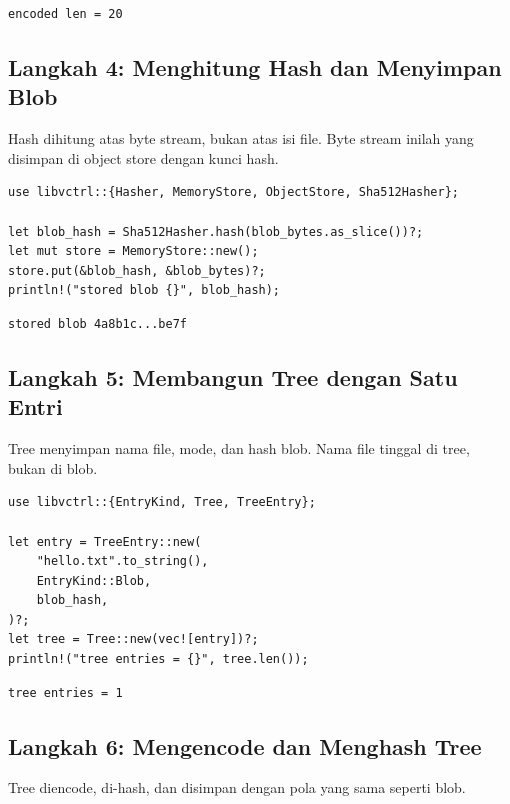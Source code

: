 \documentclass[11pt,a4paper]{article}
\begin{document}
\begin{lstlisting}[style=out]
encoded len = 20
\end{lstlisting}

\subsection{Langkah 4: Menghitung Hash dan Menyimpan Blob}

Hash dihitung atas byte stream, bukan atas isi file. Byte stream inilah yang disimpan di object store dengan kunci hash.

\begin{lstlisting}[style=code]
use libvctrl::{Hasher, MemoryStore, ObjectStore, Sha512Hasher};

let blob_hash = Sha512Hasher.hash(blob_bytes.as_slice())?;
let mut store = MemoryStore::new();
store.put(&blob_hash, &blob_bytes)?;
println!("stored blob {}", blob_hash);
\end{lstlisting}

\begin{lstlisting}[style=out]
stored blob 4a8b1c...be7f
\end{lstlisting}

\subsection{Langkah 5: Membangun Tree dengan Satu Entri}

Tree menyimpan nama file, mode, dan hash blob. Nama file tinggal di tree, bukan di blob.

\begin{lstlisting}[style=code]
use libvctrl::{EntryKind, Tree, TreeEntry};

let entry = TreeEntry::new(
    "hello.txt".to_string(),
    EntryKind::Blob,
    blob_hash,
)?;
let tree = Tree::new(vec![entry])?;
println!("tree entries = {}", tree.len());
\end{lstlisting}

\begin{lstlisting}[style=out]
tree entries = 1
\end{lstlisting}

\subsection{Langkah 6: Mengencode dan Menghash Tree}

Tree diencode, di-hash, dan disimpan dengan pola yang sama seperti blob.
\end{document}
